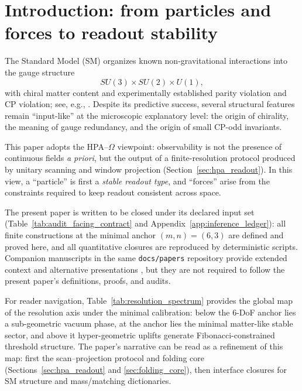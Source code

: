 
\section{Introduction: from particles and forces to readout stability}
\label{sec:introduction}

The Standard Model (SM) organizes known non-gravitational interactions into the gauge structure
\[
SU(3)\times SU(2)\times U(1),
\]
with chiral matter content and experimentally established parity violation and CP violation; see, e.g., \cite{PeskinSchroeder1995,PDGRPP2024}.
Despite its predictive success, several structural features remain ``input-like'' at the microscopic explanatory level: the origin of chirality, the meaning of gauge redundancy, and the origin of small CP-odd invariants.

This paper adopts the HPA--$\Omega$ viewpoint: observability is not the presence of continuous fields \emph{a priori}, but the output of a finite-resolution protocol produced by unitary scanning and window projection (Section~\ref{sec:hpa_readout}).
In this view, a ``particle'' is first a \emph{stable readout type}, and ``forces'' arise from the constraints required to keep readout consistent across space.

The present paper is written to be closed under its declared input set (Table~\ref{tab:audit_facing_contract} and Appendix~\ref{app:inference_ledger}): all finite constructions at the minimal anchor $(m,n)=(6,3)$ are defined and proved here, and all quantitative closures are reproduced by deterministic scripts.
Companion manuscripts in the same \texttt{docs/papers} repository provide extended context and alternative presentations \cite{Ma2025HPA,Ma2025CAP,Ma2025CAPII,Ma2025HHU,Ma2025HPT,Ma2025PCG,Ma2025RF,Ma2025HPOT,Ma2025FoP}, but they are not required to follow the present paper's definitions, proofs, and audits.

For reader navigation, Table~\ref{tab:resolution_spectrum} provides the global map of the resolution axis under the minimal calibration: below the 6-DoF anchor lies a sub-geometric vacuum phase, at the anchor lies the minimal matter-like stable sector, and above it hyper-geometric uplifts generate Fibonacci-constrained threshold structure.
The paper's narrative can be read as a refinement of this map: first the scan--projection protocol and folding core (Sections~\ref{sec:hpa_readout} and \ref{sec:folding_core}), then interface closures for SM structure and mass/matching dictionaries.


